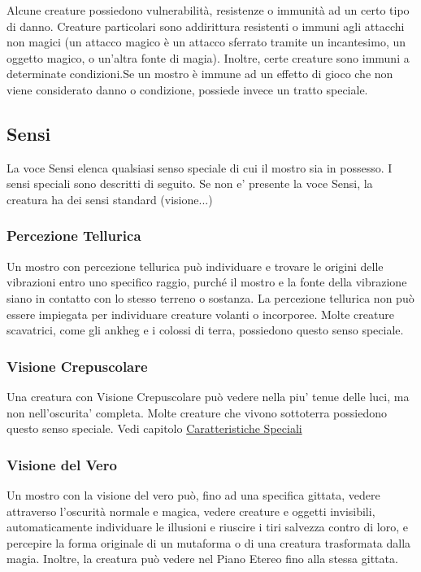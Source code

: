 \begin{multicols}{2}
Alcune creature possiedono vulnerabilità, resistenze o immunità ad un certo tipo di danno. Creature particolari sono addirittura resistenti o immuni agli attacchi non magici (un attacco magico è un attacco sferrato tramite un incantesimo, un oggetto magico, o un'altra fonte di magia). Inoltre, certe creature sono immuni a determinate condizioni.Se  un mostro è immune ad un effetto di gioco che non viene considerato danno o condizione, possiede invece un tratto speciale.

\subsection{Sensi}

La voce Sensi elenca qualsiasi senso speciale di cui il mostro sia in possesso. I
sensi speciali sono descritti di seguito. Se non e' presente la voce Sensi, la creatura ha dei sensi standard (visione...)

\subsubsection{Percezione Tellurica}

Un mostro con percezione tellurica può individuare e trovare le origini delle vibrazioni entro uno specifico raggio, purché il mostro e la fonte della vibrazione siano in contatto con lo stesso terreno o sostanza. La percezione tellurica non può essere impiegata per individuare creature volanti o incorporee. Molte creature scavatrici, come gli ankheg e i colossi di terra, possiedono questo senso speciale.

\subsubsection{Visione Crepuscolare}

Una creatura con Visione Crepuscolare può vedere nella piu' tenue delle luci, ma non nell'oscurita' completa. Molte creature che vivono sottoterra possiedono questo senso
speciale.  Vedi capitolo \hyperref[sec:sec:visione-e-luce]{Caratteristiche Speciali}

\subsubsection{Visione del Vero}

Un mostro con la visione del vero può, fino ad una specifica gittata, vedere attraverso l'oscurità normale e magica, vedere creature e oggetti invisibili, automaticamente individuare le illusioni e riuscire i tiri salvezza contro di loro, e percepire la forma originale di un mutaforma o di una creatura trasformata dalla magia. Inoltre, la creatura può vedere nel Piano Etereo fino alla stessa gittata.


\end{multicols}
